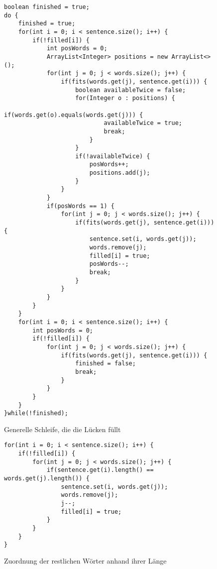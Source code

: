 \documentclass[a4paper, 12pt]{scrartcl}
\begin{document}
\begin{figure}[H]
\centering
\begin{lstlisting}
boolean finished = true;
do {
    finished = true;
    for(int i = 0; i < sentence.size(); i++) {
        if(!filled[i]) {
            int posWords = 0;
            ArrayList<Integer> positions = new ArrayList<>();
            for(int j = 0; j < words.size(); j++) {
                if(fits(words.get(j), sentence.get(i))) {
                    boolean availableTwice = false;
                    for(Integer o : positions) {
                        if(words.get(o).equals(words.get(j))) {
                            availableTwice = true;
                            break;
                        }
                    }
                    if(!availableTwice) {
                        posWords++;
                        positions.add(j);
                    }
                }
            }
            if(posWords == 1) {
                for(int j = 0; j < words.size(); j++) {
                    if(fits(words.get(j), sentence.get(i))) {
                        sentence.set(i, words.get(j));
                        words.remove(j);
                        filled[i] = true;
                        posWords--;
                        break;
                    }
                }
            }
        }
    }
    for(int i = 0; i < sentence.size(); i++) {
        int posWords = 0;
        if(!filled[i]) {
            for(int j = 0; j < words.size(); j++) {
                if(fits(words.get(j), sentence.get(i))) {
                    finished = false;
                    break;
                }
            }
        }
    }
}while(!finished);
\end{lstlisting}
\caption{Generelle Schleife, die die Lücken füllt}
\end{figure}

\begin{figure}[H]
\centering
\begin{lstlisting}
for(int i = 0; i < sentence.size(); i++) {
    if(!filled[i]) {
        for(int j = 0; j < words.size(); j++) {
            if(sentence.get(i).length() == words.get(j).length()) {
                sentence.set(i, words.get(j));
                words.remove(j);
                j--;
                filled[i] = true;
            }
        }
    }
}
\end{lstlisting}
\caption{Zuordnung der restlichen Wörter anhand ihrer Länge}
\end{figure}
\end{document}
